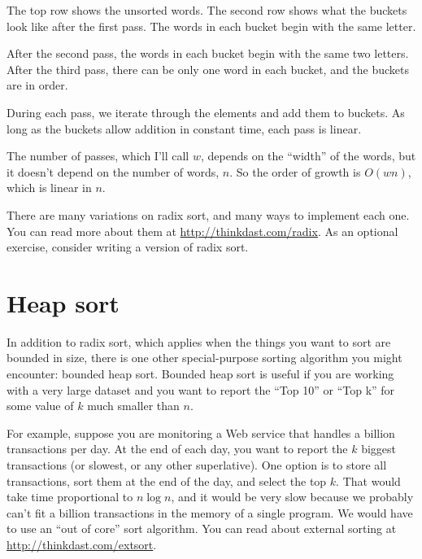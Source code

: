 \documentclass[12pt]{book}
\theoremstyle{exercise}
\begin{document}
The top row shows the unsorted words. The second row shows what the
buckets look like after the first pass. The words in each bucket begin
with the same letter.

After the second pass, the words in each bucket begin with the same two
letters. After the third pass, there can be only one word in each
bucket, and the buckets are in order.

During each pass, we iterate through the elements and add them to
buckets. As long as the buckets allow addition in constant time, each
pass is linear.


The number of passes, which I'll call $w$, depends on the ``width''
of the words, but it doesn't depend on the number of words, $n$.
So the order of growth is $O(wn)$, which is linear in $n$.

There are many variations on radix sort, and many ways to implement
each one. You can read more about them at
\url{http://thinkdast.com/radix}. As an optional
exercise, consider writing a version of radix sort.


\section{Heap sort}
\label{heap-sort}


In addition to radix sort, which applies when the things you want to
sort are bounded in size, there is one other special-purpose sorting
algorithm you might encounter: bounded heap sort. Bounded heap sort is
useful if you are working with a very large dataset and you want to
report the ``Top 10'' or ``Top k'' for some value of $k$ much
smaller than $n$.

For example, suppose you are monitoring a Web service that handles a
billion transactions per day. At the end of each day, you want to
report the $k$ biggest transactions (or slowest, or any other
superlative). One option is to store all transactions, sort them at
the end of the day, and select the top $k$. That would take time
proportional to $n \log n$, and it would be very slow because we
probably can't fit a billion transactions in the memory of a single
program. We would have to use an ``out of core'' sort algorithm. You
can read about external sorting at \url{http://thinkdast.com/extsort}.

\end{document}
